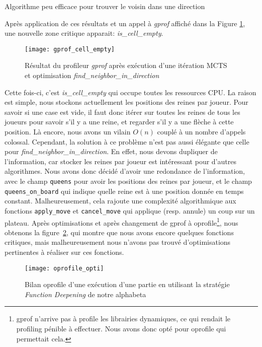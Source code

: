 \begin{algorithm}
	\caption{Algorithme peu efficace pour trouver le voisin dans une direction}
	\label{alg:find_neighbor_opti}
\end{algorithm}

Après application de ces résultats et un appel à \textit{gprof} affiché dans la Figure \ref{fig:gprof-empty-cell},
une nouvelle zone critique apparait: \emph{is\_cell\_empty}.
\begin{figure}[H]
	\centering
	\texttt{[image: gprof\_cell\_empty]}
	\captionsetup{justification=centering}
	\caption{Résultat du profileur \textit{gprof} après exécution d'une itération MCTS \\et optimisation \textit{find\_neighbor\_in\_direction}}
	\label{fig:gprof-empty-cell}
\end{figure}

Cette fois-ci, c'est \textit{is\_cell\_empty} qui occupe toutes les ressources CPU. La raison est simple,
nous stockons actuellement les positions des reines par joueur. Pour savoir si une case est vide,
il faut donc itérer sur toutes les reines de tous les joueurs pour savoir s'il y a une reine, et regarder s'il y a une flèche à cette position.
Là encore, nous avons un vilain $O(n)$ couplé à un nombre d'appels colossal. Cependant, la solution à ce problème
n'est pas aussi élégante que celle pour \textit{find\_neighbor\_in\_direction}. En effet,
nous devons dupliquer de l'information, car stocker les reines par joueur est intéressant pour d'autres algorithmes.
Nous avons donc décidé d'avoir une redondance de l'information, avec le champ \verb|queens| pour
avoir les positions des reines par joueur, et le champ \verb|queens_on_board| qui indique quelle reine est
à une position donnée en temps constant. Malheureusement, cela rajoute une complexité algorithmique aux fonctions \verb|apply_move| et \verb|cancel_move|
qui applique (resp. annule) un coup sur un plateau. Après optimisations et après changement de gprof à oprofile\footnote{gprof n'arrive pas à profile les librairies dynamiques, ce qui rendait le profiling pénible à effectuer. Nous avons donc opté pour oprofile qui permettait cela.},
nous obtenons la figure~\ref{fig:oprof-opti}, qui montre que nous avons encore quelques fonctions critiques, mais malheureusement nous
n'avons pas trouvé d'optimisations pertinentes à réaliser sur ces fonctions.

\begin{figure}[H]
	\centering
	\texttt{[image: oprofile\_opti]}
	\captionsetup{justification=centering}
	\caption{Bilan oprofile d'une exécution d'une partie en utilisant la stratégie \emph{Function Deepening} de notre alphabeta}
	\label{fig:oprof-opti}
\end{figure}